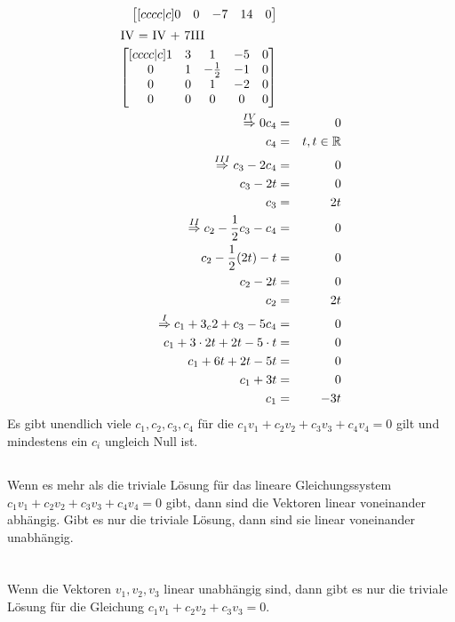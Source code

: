 \documentclass[10pt,a4paper,oneside,ngerman,numbers=noenddot]{scrartcl}
\begin{document}
\begin{alignat*}{2}
\begin{bmatrix}[cccc|c]
0 & 0 & -7 & 14 & 0
\end{bmatrix} \\
\intertext{IV = IV + 7III}
\begin{bmatrix}[cccc|c]
1 & 3 & 1 & -5 & 0 \\
0 & 1 & -\frac{1}{2} & -1 & 0 \\
0 & 0 & 1 & -2 & 0 \\
0 & 0 & 0 & 0 & 0
\end{bmatrix} \\
\overset{IV}{\Rightarrow} 0c_{4} &=& 0 \\
c_{4} &=& t, t \in \mathbb{R} \\
\overset{III}{\Rightarrow} c_{3} - 2c_{4} &=& 0 \\
c_{3} - 2t &=& 0 \\
c_{3} &=& 2t \\
\overset{II}{\Rightarrow} c_{2} - \frac{1}{2}c_{3} - c_{4} &=& 0 \\
c_{2} - \frac{1}{2}(2t) - t &=& 0 \\
c_{2} - 2t &=& 0 \\
c_{2} &=& 2t \\
\overset{I}{\Rightarrow} c_{1} + 3_c{2} + c_{3} - 5c_{4} &=& 0 \\
c_{1} + 3 \cdot 2t + 2t - 5 \cdot t &=& 0 \\
c_{1} + 6t + 2t - 5t &=& 0 \\
c_{1} + 3t &=& 0 \\
c_{1} &=& -3t
\end{alignat*}
Es gibt unendlich viele $c_{1}, c_{2}, c_{3}, c_{4}$ für die $c_{1}v_{1} + c_{2}v_{2} + c_{3}v_{3} + c_{4}v_{4} = 0$ gilt und mindestens ein $c_{i}$ ungleich Null ist.
\subsection{} %
Wenn es mehr als die triviale Lösung für das lineare Gleichungssystem $c_{1}v_{1} + c_{2}v_{2} + c_{3}v_{3} + c_{4}v_{4} = 0$ gibt, dann sind die Vektoren linear voneinander abhängig.
Gibt es nur die triviale Lösung, dann sind sie linear voneinander unabhängig.
\section{} %
\subsection{} %
Wenn die Vektoren $v_{1}, v_{2}, v_{3}$ linear unabhängig sind, dann gibt es nur die triviale Lösung für die Gleichung $c_{1}v_{1} + c_{2}v_{2} + c_{3}v_{3} = 0$.
\end{document}
